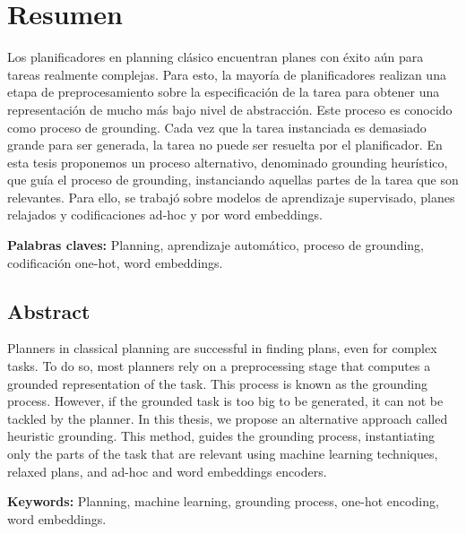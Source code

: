 \chapter*{Resumen}

Los planificadores en planning clásico encuentran planes con éxito aún para
tareas realmente complejas. Para esto, la mayoría de planificadores realizan una
etapa de preprocesamiento sobre la especificación de la tarea para obtener una
representación de mucho más bajo nivel de abstracción. Este proceso es conocido
como proceso de grounding. Cada vez que la tarea instanciada es demasiado grande
para ser generada, la tarea no puede ser resuelta por el planificador. En esta
tesis proponemos un proceso alternativo, denominado grounding heurístico, que
guía el proceso de grounding, instanciando aquellas partes de la tarea que son
relevantes. Para ello, se trabajó sobre modelos de aprendizaje supervisado,
planes relajados y codificaciones ad-hoc y por word embeddings.

\noindent
\textbf{Palabras claves:} Planning, aprendizaje automático, proceso de
grounding, codificación one-hot, word embeddings.

\section*{Abstract}

Planners in classical planning are successful in finding plans, even for complex
tasks. To do so, most planners rely on a preprocessing stage that computes a
grounded representation of the task. This process is known as the grounding
process. However, if the grounded task is too big to be generated, it can not be
tackled by the planner. In this thesis, we propose an alternative approach
called heuristic grounding. This method, guides the grounding process,
instantiating only the parts of the task that are relevant using machine
learning techniques, relaxed plans, and ad-hoc and word embeddings encoders.

\noindent
\textbf{Keywords:} Planning, machine learning, grounding process, one-hot
encoding, word embeddings.